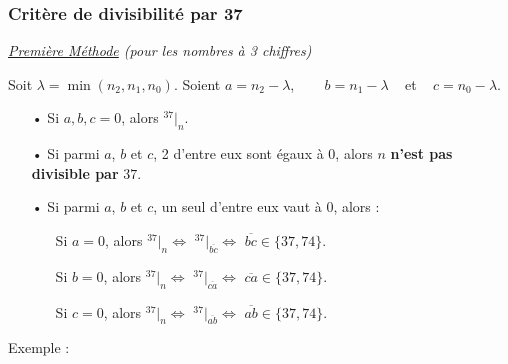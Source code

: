\documentclass[a4paper, twoside]{article}
\begin{document}
	\vfill
	{\noindent \dotfill}

	\subsubsection*{Critère de divisibilité par 37}

	{\noindent  \textit{\underline{Première Méthode} (pour les nombres à 3 chiffres)}}

	\vspace{0.2cm}

	\par Soit $\lambda =\min(n_2, n_1, n_0)$. Soient $a = n_2 - \lambda$, ~~~ $b = n_1 - \lambda$ ~ et ~ $ c = n_0 - \lambda$.

	\vspace{0.15cm}

	\begin{itemize}
		\item[•] Si $a, b, c = 0$, alors {\Large $ ^{37}|_n $}.
		\vspace{0.1cm}
		\item[•] Si parmi $a$, $b$ et $c$, 2 d'entre eux sont égaux à $0$, alors $n$ \textbf{n'est pas divisible par} $37$.
		\vspace{0.1cm}
		\item[•] Si parmi $a$, $b$ et $c$, un seul d'entre eux vaut à $0$, alors : 
		\vspace{0.1cm}
		\begin{itemize}
			\item[] Si $a = 0$, alors {\Large $ ^{37}|_n \Leftrightarrow$ $^{37}|_{\overline{bc} } \Leftrightarrow$} $\overline{bc} \in \{37,74\}$.
			\item[] Si $b = 0$, alors {\Large $ ^{37}|_n \Leftrightarrow$ $^{37}|_{\overline{ca} } \Leftrightarrow$} $\overline{ca} \in \{37,74\}$.
			\item[] Si $c = 0$, alors {\Large $ ^{37}|_n \Leftrightarrow$ $^{37}|_{\overline{ab} } \Leftrightarrow$} $\overline{ab} \in \{37,74\}$.
			
		\end{itemize}
		
	\end{itemize}
	\vspace{0.1cm}

	{ \parindent=0.5cm Exemple : }
\end{document}

